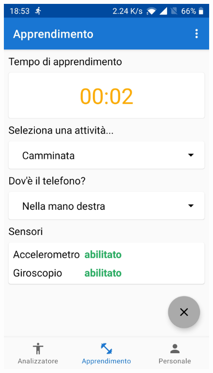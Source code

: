 \begin{figure}[H]
    \includegraphics[scale = 0.1019]{assets/images/screenshots/2b_Preparation.jpg}

\end{figure}
